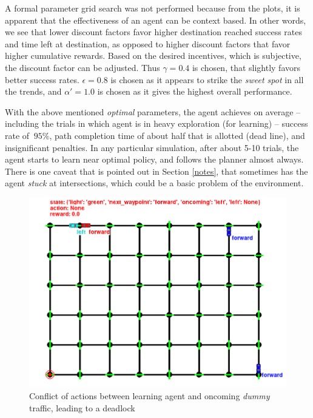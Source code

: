 \documentclass{article}
\begin{document}
	A formal parameter grid search was not performed because from the plots, it is apparent that the effectiveness of an agent can be context based. In other words, we see that lower discount factors favor higher destination reached success rates and time left at destination, as opposed to higher discount factors that favor higher cumulative rewards. Based on the desired incentives, which is subjective, the discount factor can be adjusted. Thus $\gamma = 0.4$ is chosen, that slightly favors better success rates. $\epsilon = 0.8$ is chosen as it appears to strike the \emph{sweet spot} in all the trends, and $\alpha\prime = 1.0$ is chosen as it gives the highest overall performance.
	
	With the above mentioned \emph{optimal} parameters, the agent achieves on average -- including the trials in which agent is in heavy exploration (for learning) -- success rate of $~95\%$, path completion time of about half that is allotted (dead line), and insignificant penalties. In any particular simulation, after about 5-10 trials, the agent starts to learn near optimal policy, and follows the planner almost always. There is one caveat that is pointed out in Section \ref{notes}, that sometimes has the agent \emph{stuck} at intersections, which could be a basic problem of the environment.
	
	\begin{figure}[b]
		\centering
		\includegraphics[scale=0.5]{conflict}
		\caption{Conflict of actions between learning agent and oncoming \emph{dummy} traffic, leading to a deadlock}
		\label{fig:agent_conflict}
	\end{figure}
	
\end{document}
